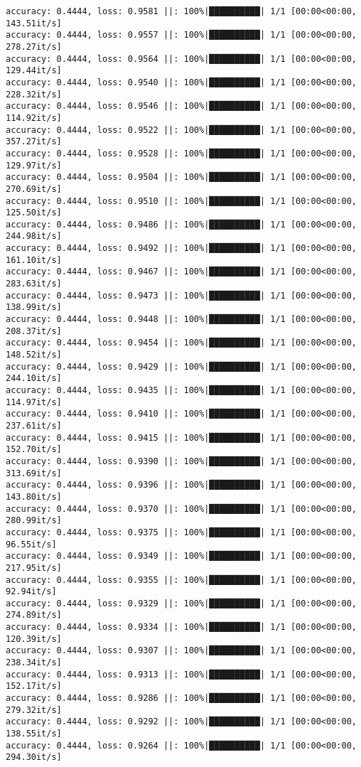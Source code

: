 \documentclass[
]{article}
\begin{document}
\begin{verbatim}
accuracy: 0.4444, loss: 0.9581 ||: 100%|██████████| 1/1 [00:00<00:00, 143.51it/s]
accuracy: 0.4444, loss: 0.9557 ||: 100%|██████████| 1/1 [00:00<00:00, 278.27it/s]
accuracy: 0.4444, loss: 0.9564 ||: 100%|██████████| 1/1 [00:00<00:00, 129.44it/s]
accuracy: 0.4444, loss: 0.9540 ||: 100%|██████████| 1/1 [00:00<00:00, 228.32it/s]
accuracy: 0.4444, loss: 0.9546 ||: 100%|██████████| 1/1 [00:00<00:00, 114.92it/s]
accuracy: 0.4444, loss: 0.9522 ||: 100%|██████████| 1/1 [00:00<00:00, 357.27it/s]
accuracy: 0.4444, loss: 0.9528 ||: 100%|██████████| 1/1 [00:00<00:00, 129.97it/s]
accuracy: 0.4444, loss: 0.9504 ||: 100%|██████████| 1/1 [00:00<00:00, 270.69it/s]
accuracy: 0.4444, loss: 0.9510 ||: 100%|██████████| 1/1 [00:00<00:00, 125.50it/s]
accuracy: 0.4444, loss: 0.9486 ||: 100%|██████████| 1/1 [00:00<00:00, 244.98it/s]
accuracy: 0.4444, loss: 0.9492 ||: 100%|██████████| 1/1 [00:00<00:00, 161.10it/s]
accuracy: 0.4444, loss: 0.9467 ||: 100%|██████████| 1/1 [00:00<00:00, 283.63it/s]
accuracy: 0.4444, loss: 0.9473 ||: 100%|██████████| 1/1 [00:00<00:00, 138.99it/s]
accuracy: 0.4444, loss: 0.9448 ||: 100%|██████████| 1/1 [00:00<00:00, 208.37it/s]
accuracy: 0.4444, loss: 0.9454 ||: 100%|██████████| 1/1 [00:00<00:00, 148.52it/s]
accuracy: 0.4444, loss: 0.9429 ||: 100%|██████████| 1/1 [00:00<00:00, 244.10it/s]
accuracy: 0.4444, loss: 0.9435 ||: 100%|██████████| 1/1 [00:00<00:00, 114.97it/s]
accuracy: 0.4444, loss: 0.9410 ||: 100%|██████████| 1/1 [00:00<00:00, 237.61it/s]
accuracy: 0.4444, loss: 0.9415 ||: 100%|██████████| 1/1 [00:00<00:00, 152.70it/s]
accuracy: 0.4444, loss: 0.9390 ||: 100%|██████████| 1/1 [00:00<00:00, 313.69it/s]
accuracy: 0.4444, loss: 0.9396 ||: 100%|██████████| 1/1 [00:00<00:00, 143.80it/s]
accuracy: 0.4444, loss: 0.9370 ||: 100%|██████████| 1/1 [00:00<00:00, 280.99it/s]
accuracy: 0.4444, loss: 0.9375 ||: 100%|██████████| 1/1 [00:00<00:00, 96.55it/s]
accuracy: 0.4444, loss: 0.9349 ||: 100%|██████████| 1/1 [00:00<00:00, 217.95it/s]
accuracy: 0.4444, loss: 0.9355 ||: 100%|██████████| 1/1 [00:00<00:00, 92.94it/s]
accuracy: 0.4444, loss: 0.9329 ||: 100%|██████████| 1/1 [00:00<00:00, 274.89it/s]
accuracy: 0.4444, loss: 0.9334 ||: 100%|██████████| 1/1 [00:00<00:00, 120.39it/s]
accuracy: 0.4444, loss: 0.9307 ||: 100%|██████████| 1/1 [00:00<00:00, 238.34it/s]
accuracy: 0.4444, loss: 0.9313 ||: 100%|██████████| 1/1 [00:00<00:00, 152.17it/s]
accuracy: 0.4444, loss: 0.9286 ||: 100%|██████████| 1/1 [00:00<00:00, 279.32it/s]
accuracy: 0.4444, loss: 0.9292 ||: 100%|██████████| 1/1 [00:00<00:00, 138.55it/s]
accuracy: 0.4444, loss: 0.9264 ||: 100%|██████████| 1/1 [00:00<00:00, 294.30it/s]

\end{verbatim}
\end{document}
